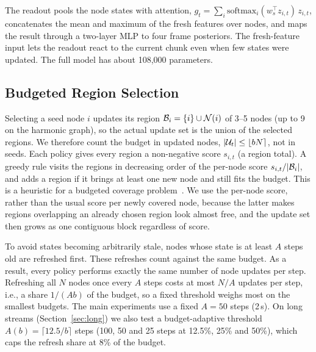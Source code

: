The readout pools the node states with attention, $g_t=\sum_i\mathrm{softmax}_i(w_s^\top z_{i,t})\,z_{i,t}$, concatenates the mean and maximum of the fresh features over nodes, and maps the result through a two-layer MLP to four frame posteriors. The fresh-feature input lets the readout react to the current chunk even when few states were updated. The full model has about 108,000 parameters.

\subsection{Budgeted Region Selection}
\label{sec:selection}
Selecting a seed node $i$ updates its region $\mathcal{B}_i=\{i\}\cup\mathcal{N}(i)$ of 3--5 nodes (up to 9 on the harmonic graph), so the actual update set is the union of the selected regions. We therefore count the budget in updated nodes, $|\mathcal{U}_t|\le\lfloor bN\rceil$, not in seeds. Each policy gives every region a non-negative score $s_{i,t}$ (a region total). A greedy rule visits the regions in decreasing order of the per-node score $s_{i,t}/|\mathcal{B}_i|$, and adds a region if it brings at least one new node and still fits the budget. This is a heuristic for a budgeted coverage problem~\cite{khuller1999budgeted}. We use the per-node score, rather than the usual score per newly covered node, because the latter makes regions overlapping an already chosen region look almost free, and the update set then grows as one contiguous block regardless of score.

To avoid states becoming arbitrarily stale, nodes whose state is at least $A$ steps old are refreshed first. These refreshes count against the same budget. As a result, every policy performs exactly the same number of node updates per step. Refreshing all $N$ nodes once every $A$ steps costs at most $N/A$ updates per step, i.e., a share $1/(Ab)$ of the budget, so a fixed threshold weighs most on the smallest budgets. The main experiments use a fixed $A{=}50$ steps (2\,s). On long streams (Section~\ref{sec:long}) we also test a budget-adaptive threshold $A(b)=\lceil 12.5/b\rceil$ steps (100, 50 and 25 steps at 12.5\%, 25\% and 50\%), which caps the refresh share at 8\% of the budget.

